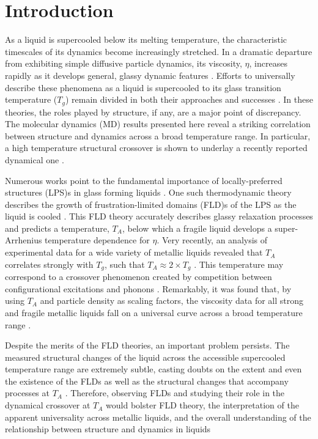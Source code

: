 \documentclass[aps,prl,preprint,showpacs,amsmath,floatfix,superscriptaddress]{revtex4}
\begin{document}
\section{Introduction}

As a liquid is supercooled below its melting temperature, the
characteristic timescales of its dynamics become increasingly
stretched. In a dramatic departure from exhibiting simple
diffusive particle dynamics, its viscosity, $\eta$, increases
rapidly as it develops general, glassy dynamic features
\cite{1970Johari, 2000Angell, 2009Cavagna, 2009Gotze}. Efforts to
universally describe these phenomena as a liquid is supercooled to
its glass transition temperature ($T_{g}$) remain divided in both
their approaches and successes \cite{Karmakar2014, 2009Cavagna,
2009Gotze, Kirkpatrick1989, Debendetti2001, Kivelson2008, Das2004,
Angell2008, Tarjus2005,Tanaka2000, Aharanov2007}. In these
theories, the roles played by structure, if any, are a major point
of discrepancy. The molecular dynamics (MD) results presented here
reveal a striking correlation between structure and dynamics
across a broad temperature range. In particular, a high
temperature structural crossover is shown to underlay a recently
reported dynamical one \cite{Kelton2014}.

Numerous works point to the fundamental importance of
locally-preferred structures (LPS)s in glass forming liquids
\cite{Tarjus2005, Tanaka2010, Chen1988, Baumer2013, Malins2013}. One such
thermodynamic theory describes the growth of frustration-limited
domains (FLD)s of the LPS as the liquid is cooled
\cite{Tarjus2005, Kivelson1995, Nussinov2004}. This FLD theory accurately
describes glassy relaxation processes and predicts a temperature,
$T_{A}$, below which a fragile liquid develops a super-Arrhenius
temperature dependence for $\eta$. Very recently, an analysis of
experimental data for a wide variety of metallic liquids revealed
that $T_{A}$ correlates strongly with $T_{g}$, such that $T_{A}
\approx 2 \times T_{g}$ \cite{Kelton2014}. This temperature may
correspond to a crossover phenomenon created by competition
between configurational excitations and phonons \cite{Iwashita2013}.
Remarkably, it was found that, by using $T_{A}$ and
particle density as scaling factors, the viscosity data for all
strong and fragile metallic liquids fall on a universal curve
across a broad temperature range \cite{Kivelson1995,Kelton2014}.

Despite the merits of the FLD theories, an important problem
persists.  The measured structural changes of the liquid across
the accessible supercooled temperature range are extremely subtle,
casting doubts on the extent and even the existence of the FLDs
\cite{2009Cavagna, Kivelson2008} as well as the structural changes
that accompany processes at $T_{A}$ \cite{Chen1988, Iwashita2013}.
Therefore, observing FLDs and studying their role in the dynamical
crossover at $T_{A}$ would bolster FLD theory, the interpretation
of the apparent universality across metallic liquids, and the
overall understanding of the relationship between structure and
dynamics in liquids
\end{document}
